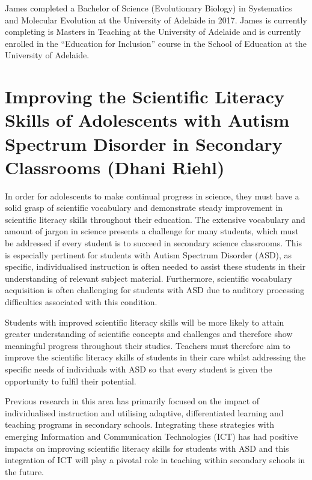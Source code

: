 \documentclass[twoside,12pt,a4paper,notitlepage]{memoir}
\begin{document}
James completed a Bachelor of Science (Evolutionary Biology) in Systematics and Molecular Evolution at the University of Adelaide in 2017. James is currently completing is Masters in Teaching at the University of Adelaide and is currently enrolled in the “Education for Inclusion” course in the School of Education at the University of Adelaide.



\pagebreak
\section*{Improving the Scientific Literacy Skills of Adolescents with Autism Spectrum Disorder in Secondary Classrooms (Dhani Riehl)}
\label{aut:riehl}

In order for adolescents to make continual progress in science, they must have a solid grasp of scientific vocabulary and demonstrate steady improvement in scientific literacy skills throughout their education. The extensive vocabulary and amount of jargon in science presents a challenge for many students, which must be addressed if every student is to succeed in secondary science classrooms. This is especially pertinent for students with Autism Spectrum Disorder (ASD), as specific, individualised instruction is often needed to assist these students in their understanding of relevant subject material. Furthermore, scientific vocabulary acquisition is often challenging for students with ASD due to auditory processing difficulties associated with this condition.

Students with improved scientific literacy skills will be more likely to attain greater understanding of scientific concepts and challenges and therefore show meaningful progress throughout their studies. Teachers must therefore aim to improve the scientific literacy skills of students in their care whilst addressing the specific needs of individuals with ASD so that every student is given the opportunity to fulfil their potential.

Previous research in this area has primarily focused on the impact of individualised instruction and utilising adaptive, differentiated learning and teaching programs in secondary schools. Integrating these strategies with emerging Information and Communication Technologies (ICT) has had positive impacts on improving scientific literacy skills for students with ASD and this integration of ICT will play a pivotal role in teaching within secondary schools in the future.
\end{document}
